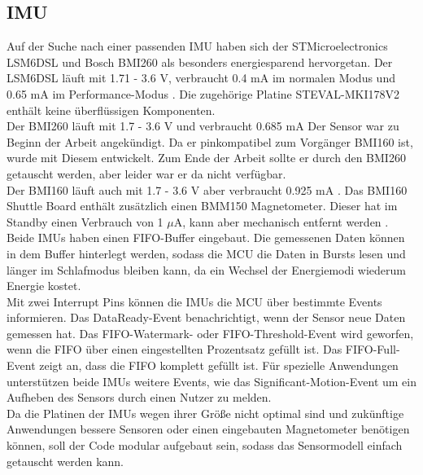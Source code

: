 \subsection{IMU}
Auf der Suche nach einer passenden IMU haben sich der STMicroelectronics LSM6DSL und Bosch BMI260 als besonders energiesparend hervorgetan.
Der LSM6DSL läuft mit 1.71 - 3.6 V, verbraucht 0.4 mA im normalen Modus und 0.65 mA im Performance-Modus \cite{datasheet_lsm6dsl}. Die zugehörige Platine STEVAL-MKI178V2 enthält keine überflüssigen Komponenten.\\
Der BMI260 läuft mit 1.7 - 3.6 V und verbraucht 0.685 mA
Der Sensor war zu Beginn der Arbeit angekündigt.
Da er pinkompatibel zum Vorgänger BMI160 ist, wurde mit Diesem entwickelt.
Zum Ende der Arbeit sollte er durch den BMI260 getauscht werden, aber leider war er da nicht verfügbar. \cite{site_bmi260}\\
Der BMI160 läuft auch mit 1.7 - 3.6 V aber verbraucht 0.925 mA \cite{datasheet_bmi160}.
Das BMI160 Shuttle Board enthält zusätzlich einen BMM150 Magnetometer.
Dieser hat im Standby einen Verbrauch von 1 $\mu$A, kann aber mechanisch entfernt werden \cite{datasheet_bmm150}.\\
Beide IMUs haben einen FIFO-Buffer eingebaut.
Die gemessenen Daten können in dem Buffer hinterlegt werden, sodass die MCU die Daten in Bursts lesen und länger im Schlafmodus bleiben kann, da ein Wechsel der Energiemodi wiederum Energie kostet.\\
Mit zwei Interrupt Pins können die IMUs die MCU über bestimmte Events informieren.
Das DataReady-Event benachrichtigt, wenn der Sensor neue Daten gemessen hat.
Das FIFO-Watermark- oder FIFO-Threshold-Event wird geworfen, wenn die FIFO über einen eingestellten Prozentsatz gefüllt ist.
Das FIFO-Full-Event zeigt an, dass die FIFO komplett gefüllt ist.
Für spezielle Anwendungen unterstützen beide IMUs weitere Events, wie das Significant-Motion-Event um ein Aufheben des Sensors durch einen Nutzer zu melden.\\
Da die Platinen der IMUs wegen ihrer Größe nicht optimal sind und zukünftige Anwendungen bessere Sensoren oder einen eingebauten Magnetometer benötigen können, soll der Code modular aufgebaut sein, sodass das Sensormodell einfach getauscht werden kann.

